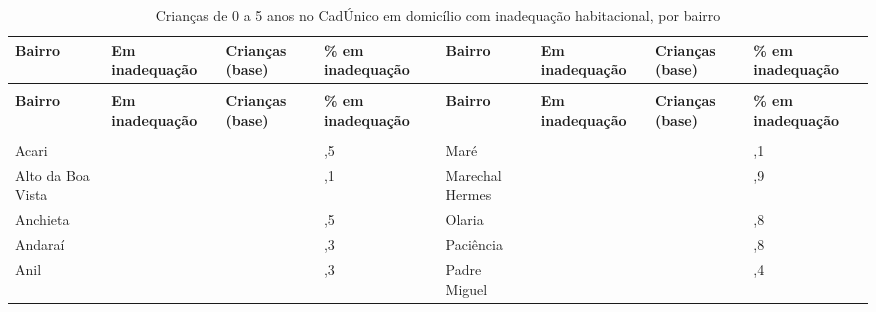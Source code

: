\begin{apendicesenv}
{\renewcommand{\arraystretch}{1.0}
{\footnotesize\setlength{\tabcolsep}{3.5pt}
\begin{longtable}{@{}>{\raggedright\arraybackslash}p{2.95cm}>{\raggedleft\arraybackslash}p{1.25cm}>{\raggedleft\arraybackslash}p{1.25cm}>{\raggedleft\arraybackslash}p{1.25cm}@{\hspace{0.6cm}}>{\raggedright\arraybackslash}p{2.95cm}>{\raggedleft\arraybackslash}p{1.25cm}>{\raggedleft\arraybackslash}p{1.25cm}>{\raggedleft\arraybackslash}p{1.25cm}@{}}
\caption{Crianças de 0 a 5 anos no CadÚnico em domicílio com inadequação habitacional, por bairro}\label{tab:tabela-mapa-cadunico-inadequacao-bairro-2026}\\
\toprule \hyphenpenalty=10000\exhyphenpenalty=10000\textbf{Bairro} & \hyphenpenalty=10000\exhyphenpenalty=10000\textbf{Em inadequação} & \hyphenpenalty=10000\exhyphenpenalty=10000\textbf{Crianças (base)} & \hyphenpenalty=10000\exhyphenpenalty=10000\textbf{\% em inadequação} & \hyphenpenalty=10000\exhyphenpenalty=10000\textbf{Bairro} & \hyphenpenalty=10000\exhyphenpenalty=10000\textbf{Em inadequação} & \hyphenpenalty=10000\exhyphenpenalty=10000\textbf{Crianças (base)} & \hyphenpenalty=10000\exhyphenpenalty=10000\textbf{\% em inadequação} \\ \midrule \endfirsthead
\multicolumn{8}{@{}l}{\footnotesize\itshape (continuação)}\\ \toprule \hyphenpenalty=10000\exhyphenpenalty=10000\textbf{Bairro} & \hyphenpenalty=10000\exhyphenpenalty=10000\textbf{Em inadequação} & \hyphenpenalty=10000\exhyphenpenalty=10000\textbf{Crianças (base)} & \hyphenpenalty=10000\exhyphenpenalty=10000\textbf{\% em inadequação} & \hyphenpenalty=10000\exhyphenpenalty=10000\textbf{Bairro} & \hyphenpenalty=10000\exhyphenpenalty=10000\textbf{Em inadequação} & \hyphenpenalty=10000\exhyphenpenalty=10000\textbf{Crianças (base)} & \hyphenpenalty=10000\exhyphenpenalty=10000\textbf{\% em inadequação} \\ \midrule \endhead
\midrule \multicolumn{8}{r@{}}{\footnotesize\itshape (continua)}\\ \endfoot
\bottomrule \endlastfoot
Acari & 106 & 1.632 & 6,5 & Maré & 143 & 3.496 & 4,1 \\
Alto da Boa Vista & 83 & 188 & 44,1 & Marechal Hermes & 43 & 1.089 & 3,9 \\
Anchieta & 155 & 2.382 & 6,5 & Olaria & 91 & 1.032 & 8,8 \\
Andaraí & 46 & 447 & 10,3 & Paciência & 276 & 4.746 & 5,8 \\
Anil & 211 & 3.372 & 6,3 & Padre Miguel & 38 & 1.566 & 2,4 \\

\end{longtable}}}
\end{apendicesenv}

